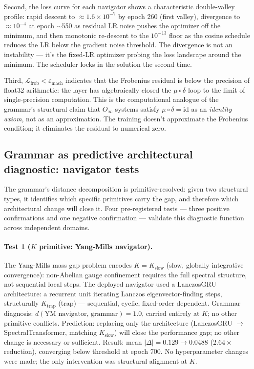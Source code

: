 \documentclass[12pt,a4paper]{article}
\begin{document}
Second, the loss curve for each navigator shows a characteristic
double-valley profile: rapid descent to $\approx 1.6 \times 10^{-7}$
by epoch 260 (first valley), divergence to $\approx 10^{-4}$ at epoch
$\sim$550 as residual LR noise pushes the optimizer off the minimum,
and then monotonic re-descent to the $10^{-13}$ floor as the cosine
schedule reduces the LR below the gradient noise threshold. The
divergence is not an instability --- it's the fixed-LR optimizer
probing the loss landscape around the minimum. The scheduler locks in
the solution the second time.

Third, $\mathcal{L}_\text{frob} < \varepsilon_\text{mach}$ indicates
that the Frobenius residual is below the precision of float32
arithmetic: the layer has algebraically closed the $\mu \circ \delta$
loop to the limit of single-precision computation. This is the
computational analogue of the grammar's structural claim that
$O_\infty$ systems satisfy $\mu \circ \delta = \mathrm{id}$ as an
\emph{identity axiom}, not as an approximation. The training doesn't
approximate the Frobenius condition; it eliminates the residual to
numerical zero.

\subsection{Grammar as predictive architectural diagnostic: navigator tests}
\label{sec:navigator_tests}

The grammar's distance decomposition is primitive-resolved: given two
structural types, it identifies which specific primitives carry the
gap, and therefore which architectural change will close it. Four
pre-registered tests --- three positive confirmations and one
negative confirmation --- validate this diagnostic function across
independent domains.

\paragraph{Test 1 ($K$ primitive: Yang-Mills navigator).}
The Yang-Mills mass gap problem encodes $K = K_\text{slow}$
(slow, globally integrative convergence): non-Abelian gauge
confinement requires the full spectral structure, not sequential
local steps. The deployed navigator used a LanczosGRU architecture:
a recurrent unit iterating Lanczos eigenvector-finding steps,
structurally $K_\text{trap}$ (trap) --- sequential, cyclic,
fixed-order dependent. Grammar diagnosis:
$d(\text{YM navigator},\,\text{grammar}) = 1.0$, carried entirely
at $K$; no other primitive conflicts. Prediction: replacing only the
architecture (LanczosGRU $\to$ SpectralTransformer, matching
$K_\text{slow}$) will close the performance gap; no other change
is necessary or sufficient. Result: mean $|\Delta| = 0.129 \to 0.0488$
($2.64\times$ reduction), converging below threshold at epoch 700. No
hyperparameter changes were made; the only intervention was
structural alignment at $K$.
\end{document}
